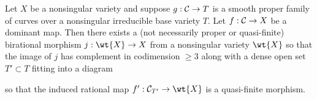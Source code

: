 \documentclass[main.tex]{subfiles}
\begin{document}
\begin{lemma} \label{lemma:replace_by_quasi-finite}
Let $X$ be a nonsingular variety and suppose $g : \mathcal{C} \to T$ is a smooth proper family of curves over a nonsingular irreducible base variety $T$. Let $f : \mathcal{C} \to X$ be a dominant map. Then there exists a (not necessarily proper or quasi-finite) birational morphism $j : \wt{X} \to X$ from a nonsingular variety $\wt{X}$ so that the image of $j$ has complement in codimension $\ge 3$ along with a dense open set $T' \subset T$ fitting into a diagram
\begin{center}
\end{center}
so that the induced rational map $f' : \cC_{T'} \to \wt{X}$ is a quasi-finite morphism.
\end{lemma}
\end{document}
